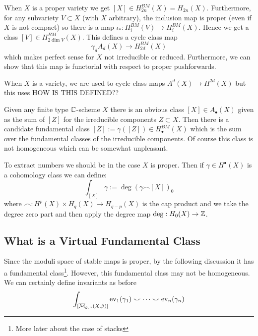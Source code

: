 \documentclass[12pt]{article}
\newcommand{\Mbar}{\ol{\M}}
\begin{document}
When $X$ is a proper variety we get $[X] \in H_{2n}^{BM}(X) = H_{2n}(X)$. Furthermore, for any subvariety $V \subset X$ (with $X$ arbitrary), the inclusion map is proper (even if $X$ is not compact) so there is a map $\iota_* : H^{BM}_i(V) \to H^{BM}_i(X)$. Hence we get a class $[V] \in H^{BM}_{2 \dim{V}}(X)$. This defines a cycle class map
\[ \gamma_d A_d(X) \to H^{BM}_{2d}(X) \]
which makes perfect sense for $X$ not irreducible or reduced. Furthermore, we can show that this map is functorial with respect to proper pushforwards. 

\begin{rmk}
When $X$ is a variety, we are used to cycle class maps $A^d(X) \to H^{2d}(X)$ but this uses {\color{red} HOW IS THIS DEFINED??}
\end{rmk}

Given any finite type $\mathbb{C}$-scheme $X$ there is an obvious class $[X] \in A_\bullet(X)$ given as the sum of $[Z]$ for the irreducible components $Z \subset X$. Then there is a candidate fundamental class $[Z] := \gamma([Z]) \in H^{BM}_\bullet(X)$ which is the sum over the fundamental classes of the irreducible components. Of course this class is not homogeneous which can be somewhat unpleasant. 
\par 
To extract numbers we should be in the case $X$ is proper. Then if $\gamma \in H^\bullet(X)$ is a cohomology class we can define:
\[ \int_{[X]} \gamma := \deg{(\gamma \frown [X])_0} \]
where $\frown : H^p(X) \times H_q(X) \to H_{q-p}(X)$ is the cap product and we take the degree zero part and then apply the degree map $\deg : H_0(X) \to \mathbb{Z}$. 

\subsection{What is a Virtual Fundamental Class}

Since the moduli space of stable maps is proper, by the following discussion it has a fundamental class\footnote{More later about the case of stacks}. However, this fundamental class may not be homogeneous. We can certainly define invariants as before
\[ \int_{[\Mbar_{g,n}(X, \beta)]} \ev_1(\gamma_1) \smile \cdots \smile \ev_n(\gamma_n) \]
\end{document}
